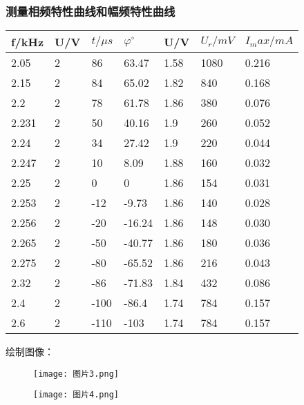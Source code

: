 \documentclass[11pt,a4paper]{article}
\begin{document}
    \subsubsection{测量相频特性曲线和幅频特性曲线}
    \begin{table}[H]
        \centering
        \begin{tabular}{|l|l|l|l|l|l|l|}
        \hline
            f/kHz & U/V & $t/\mu s$ & $\varphi^{\circ}$ & U/V & $U_r/mV$ & $I_max/mA$ \\ \hline
            2.05 & 2 & 86 & 63.47  & 1.58 & 1080  & 0.216  \\ \hline
            2.15 & 2 & 84 & 65.02  & 1.82 & 840  & 0.168  \\ \hline
            2.2 & 2 & 78 & 61.78  & 1.86 & 380 & 0.076  \\ \hline
            2.231 & 2 & 50 & 40.16  & 1.9 & 260  & 0.052  \\ \hline
            2.24 & 2 & 34 & 27.42  & 1.9 & 220  & 0.044  \\ \hline
            2.247 & 2 & 10 & 8.09  & 1.88 & 160  & 0.032  \\ \hline
            2.25 & 2 & 0 & 0 & 1.86 & 154  & 0.031  \\ \hline
            2.253 & 2 & -12 & -9.73  & 1.86 & 140  & 0.028  \\ \hline
            2.256 & 2 & -20 & -16.24  & 1.86 & 148  & 0.030  \\ \hline
            2.265 & 2 & -50 & -40.77  & 1.86 & 180  & 0.036  \\ \hline
            2.275 & 2 & -80 & -65.52  & 1.86 & 216  & 0.043  \\ \hline
            2.32 & 2 & -86 & -71.83  & 1.84 & 432  & 0.086  \\ \hline
            2.4 & 2 & -100 & -86.4  & 1.74 & 784 & 0.157 \\ \hline
            2.6 & 2 & -110 & -103  & 1.74 & 784 & 0.157 \\ \hline
        \end{tabular}
    \end{table}

    绘制图像：
    \begin{figure}[H]
        \centering
        \texttt{[image: 图片3.png]}
    \end{figure}
    \begin{figure}[H]
        \centering
        \texttt{[image: 图片4.png]}
    \end{figure}
\end{document}
